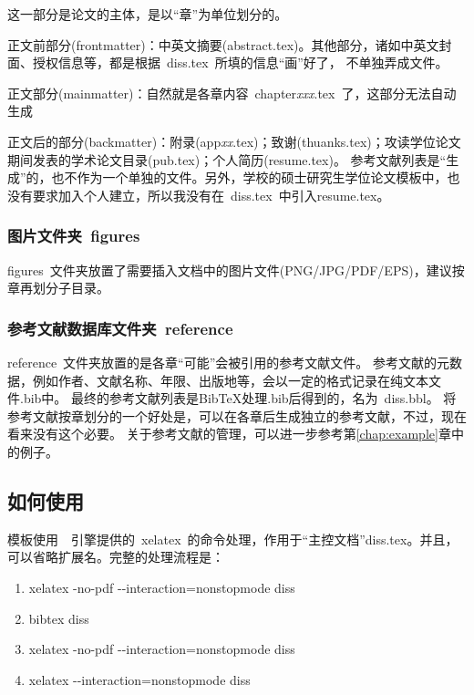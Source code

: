 这一部分是论文的主体，是以``章''为单位划分的。

正文前部分(frontmatter)：中英文摘要(abstract.tex)。其他部分，诸如中英文封面、授权信息等，都是根据~diss.tex~所填的信息``画''好了，
不单独弄成文件。

正文部分(mainmatter)：自然就是各章内容~chapter\emph{xxx}.tex~了，这部分无法自动生成{\LARGE\Smiley}

正文后的部分(backmatter)：附录(app\emph{xx}.tex)；致谢(thuanks.tex)；攻读学位论文期间发表的学术论文目录(pub.tex)；个人简历(resume.tex)。
参考文献列表是``生成''的，也不作为一个单独的文件。另外，学校的硕士研究生学位论文模板中，也没有要求加入个人建立，所以我没有在~diss.tex~中引入resume.tex。

\subsubsection{图片文件夹~figures}
\label{sec:figuresdir}

figures~文件夹放置了需要插入文档中的图片文件(PNG/JPG/PDF/EPS)，建议按章再划分子目录。

\subsubsection{参考文献数据库文件夹~reference}
\label{sec:bibdir}

reference~文件夹放置的是各章``可能''会被引用的参考文献文件。
参考文献的元数据，例如作者、文献名称、年限、出版地等，会以一定的格式记录在纯文本文件.bib中。
最终的参考文献列表是BibTeX处理.bib后得到的，名为~diss.bbl。
将参考文献按章划分的一个好处是，可以在各章后生成独立的参考文献，不过，现在看来没有这个必要。
关于参考文献的管理，可以进一步参考第\ref{chap:example}章中的例子。

\subsection{如何使用}
\label{sec:process}

模板使用~\XeTeX~引擎提供的~xelatex~的命令处理，作用于“主控文档”diss.tex。并且，可以省略扩展名。完整的处理流程是：
\begin{enumerate}
\item[] xelatex -no-pdf -{}-interaction=nonstopmode diss
\item[] bibtex diss 
\item[] xelatex -no-pdf -{}-interaction=nonstopmode diss 
\item[] xelatex -{}-interaction=nonstopmode diss 
\end{enumerate}

